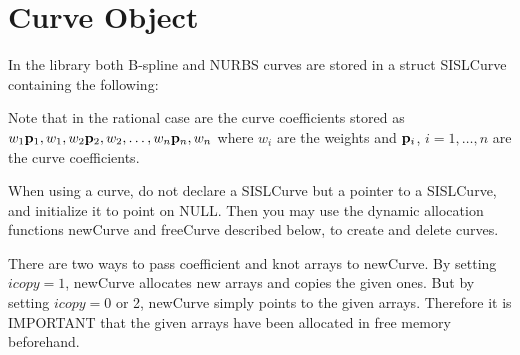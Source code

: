 \section{\label{curveobject}Curve Object}

In the library both B-spline and NURBS curves are stored in a struct SISLCurve containing
the following:

Note that in the rational case are the curve coefficients stored as
\newline
${w_1  {\bf p}_1, w_1, w_2 {\bf p}_2, w_2, \ldots,
  w_n  {\bf p}_n, w_n}$ where $w_i$ are the weights and ${\bf p}_i$, $i=1, \ldots, n$ are the
curve coefficients.

When using a curve, do not declare a SISLCurve but a pointer to a SISLCurve,
and initialize it to point on NULL. Then you may use the
dynamic allocation functions newCurve and freeCurve described below,
to create and delete curves.

There are two ways to pass coefficient and knot arrays
to newCurve.
By setting $icopy=1$, newCurve
allocates new arrays and copies the given ones.
But by setting $icopy=0$ or 2, newCurve simply points
to the given arrays. Therefore it is IMPORTANT that the
given arrays have been allocated in free memory beforehand.

\pgsbreak

\pgsbreak

\pgsbreak

